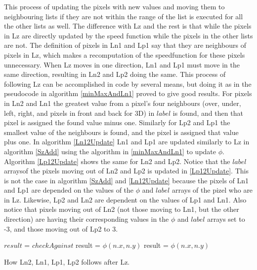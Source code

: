 This process of updating the pixels with new values and moving them to neighbouring lists if they are not within the range of the list is executed for all the other lists as well. The difference with Lz and the rest is that while the pixels in Lz are directly updated by the speed function while the pixels in the other lists are not. The definition of pixels in Ln1 and Lp1 say that they are neighbours of pixels in Lz, which makes a recomputation of the speedfunction for these pixels unnecessary. When Lz moves in one direction, Ln1 and Lp1 must move in the same direction, resulting in Ln2 and Lp2 doing the same. This process of following Lz can be accomplished in code by several means, but doing it as in the pseudocode in algorithm \ref{minMaxAndLn1} proved to give good results. For pixels in Ln2 and Ln1 the greatest value from a pixel's four neighbours (over, under, left, right, and pixels in front and back for 3D) in $label$ is found, and then that pixel is assigned the found value minus one. Similarly for Lp2 and Lp1 the smallest value of the neighbours is found, and the pixel is assigned that value plus one. In algorithm \ref{Ln12Update} Ln1 and Lp1 are updated similarly to Lz in algorithm \ref{SzAdd} using the algorithm in \ref{minMaxAndLn1} to update $\phi$. Algorithm \ref{Lp12Update} shows the same for Ln2 and Lp2. Notice that the $label$ arraysof the pixels moving out of Ln2 and Lp2 is updated in \ref{Lp12Update}. This is not the case in algorithm \ref{SzAdd} and \ref{Ln12Update} because the pixels of Ln1 and Lp1 are depended on the values of the $\phi$ and $label$ arrays of the pizel who are in Lz. Likewise, Lp2 and Ln2 are dependent on the values of Lp1 and Ln1. Also notice that pixels moving out of Ln2 (not those moving to Ln1, but the other direction) are having their corresponding values in the $\phi$ and $label$ arrays set to -3, and those moving out of Lp2 to 3.

\begin{algorithm}[h!]
\begin{algorithmic}[1]
\Statex {}
\State $result$ = $checkAgainst$
 
		\Statex {}
	  		\State result = $\phi(n.x, n.y)$
	  	\EndIf
	\EndFor
\EndIf
{}  
	  		\State result = $\phi(n.x, n.y)$
	  	\EndIf
	\EndFor
\EndIf
\EndProcedure
\end{algorithmic}
\caption{How Ln2, Ln1, Lp1, Lp2 follows after Lz.}
\label{minMaxAndLn1}
\end{algorithm}

